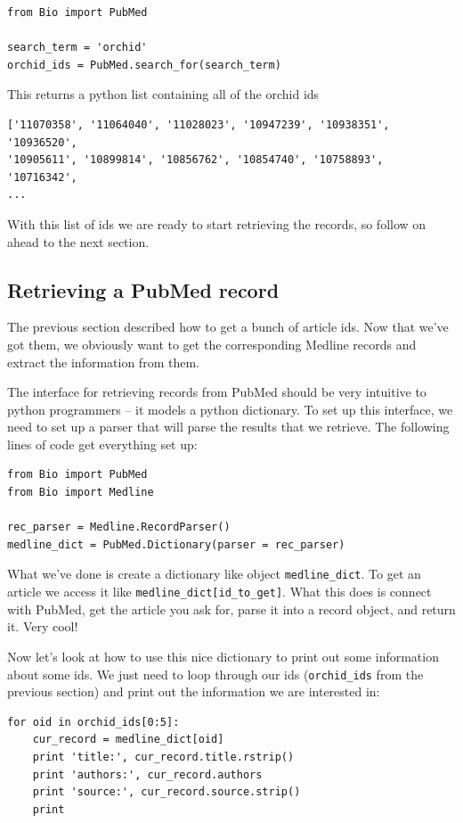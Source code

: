 \documentclass{report}
\begin{document}
\begin{verbatim}
from Bio import PubMed

search_term = 'orchid'
orchid_ids = PubMed.search_for(search_term)
\end{verbatim}

This returns a python list containing all of the orchid ids

\begin{verbatim}
['11070358', '11064040', '11028023', '10947239', '10938351', '10936520', 
'10905611', '10899814', '10856762', '10854740', '10758893', '10716342', 
...
\end{verbatim}

With this list of ids we are ready to start retrieving the records, so follow on ahead to the next section.

\subsection{Retrieving a PubMed record}

The previous section described how to get a bunch of article ids. Now that we've got them, we obviously want to get the corresponding Medline records and extract the information from them. 


The interface for retrieving records from PubMed should be very intuitive to python programmers -- it models a python dictionary. To set up this interface, we need to set up a parser that will parse the results that we retrieve. The following lines of code get everything set up:

\begin{verbatim}
from Bio import PubMed
from Bio import Medline

rec_parser = Medline.RecordParser()
medline_dict = PubMed.Dictionary(parser = rec_parser)
\end{verbatim}

What we've done is create a dictionary like object \verb|medline_dict|. To get an article we access it like \verb|medline_dict[id_to_get]|. What this does is connect with PubMed, get the article you ask for, parse it into a record object, and return it. Very cool! 


Now let's look at how to use this nice dictionary to print out some information about some ids. We just need to loop through our ids (\verb|orchid_ids| from the previous section) and print out the information we are interested in:

\begin{verbatim}
for oid in orchid_ids[0:5]:
    cur_record = medline_dict[oid]
    print 'title:', cur_record.title.rstrip()
    print 'authors:', cur_record.authors
    print 'source:', cur_record.source.strip()
    print
\end{verbatim}
\end{document}
